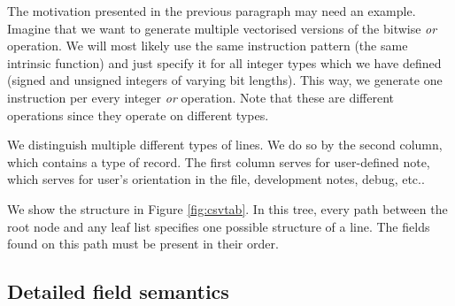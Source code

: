The motivation presented in the previous paragraph may need an example. Imagine that we want to generate multiple vectorised versions of the bitwise \emph{or} operation. We will most likely use the same instruction pattern (the same intrinsic function) and just specify it for all integer types which we have defined (signed and unsigned integers of varying bit lengths). This way, we generate one instruction per every integer \emph{or} operation. Note that these are different operations since they operate on different types.

We distinguish multiple different types of lines. We do so by the second column, which contains a type of record. The first column serves for user-defined note, which serves for user's orientation in the file, development notes, debug, etc..

We show the structure in Figure \ref{fig:csvtab}. In this tree, every path between the root node and any leaf list specifies one possible structure of a line. The fields found on this path must be present in their order.

\mybeginfig
{}

\subsection{Detailed field semantics}

